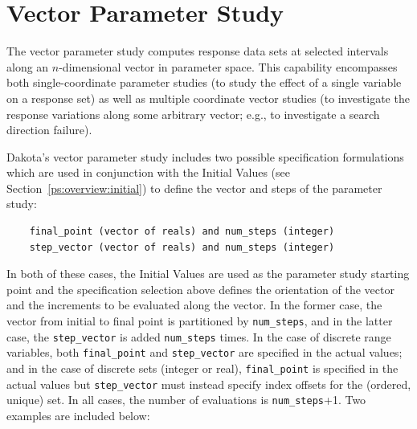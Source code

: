 \section{Vector Parameter Study}\label{ps:vector}

The vector parameter study computes response data sets at selected
intervals along an $n$-dimensional vector in parameter space. This
capability encompasses both single-coordinate parameter studies (to
study the effect of a single variable on a response set) as well as
multiple coordinate vector studies (to investigate the response
variations along some arbitrary vector; e.g., to investigate a
search direction failure).

Dakota's vector parameter study includes two possible specification
formulations which are used in conjunction with the Initial Values
(see Section~\ref{ps:overview:initial}) to define the vector and steps
of the parameter study:
\begin{small}
\begin{verbatim}
    final_point (vector of reals) and num_steps (integer)
    step_vector (vector of reals) and num_steps (integer)
\end{verbatim}
\end{small}

In both of these cases, the Initial Values are used as the parameter
study starting point and the specification selection above defines the
orientation of the vector and the increments to be evaluated along the
vector. In the former case, the vector from initial to final point is
partitioned by \texttt{num\_steps}, and in the latter case, the 
\texttt{step\_vector} is added \texttt{num\_steps} times.  In the case
of discrete range variables, both \texttt{final\_point} and 
\texttt{step\_vector} are specified in the actual values; and in the
case of discrete sets (integer or real), \texttt{final\_point} is
specified in the actual values but \texttt{step\_vector} must instead
specify index offsets for the (ordered, unique) set.  In all cases,
the number of evaluations is \texttt{num\_steps}+1. Two examples are
included below:

